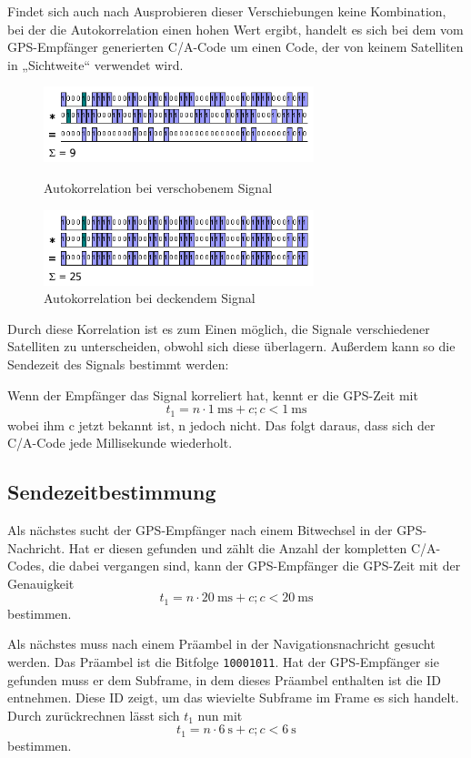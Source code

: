 \documentclass[12pt,a4paper]{scrartcl}
\begin{document}
Findet sich auch nach Ausprobieren dieser Verschiebungen keine Kombination, bei der die Autokorrelation einen hohen Wert ergibt, handelt es sich bei dem vom GPS-Empfänger generierten C/A-Code um einen Code, der von keinem Satelliten in „Sichtweite“ verwendet wird.

\begin{figure}[H]
\centering
\includegraphics[width=0.7\textwidth]{img/ac_9.png}
\caption{Autokorrelation bei verschobenem Signal\cite{kowoma_signalv}}
\includegraphics[width=0.7\textwidth]{img/ac_25.png}
\caption{Autokorrelation bei deckendem Signal\cite{kowoma_signalv}}
\label{fig:ac}
\end{figure}

Durch diese Korrelation ist es zum Einen möglich, die Signale verschiedener Satelliten zu unterscheiden, obwohl sich diese überlagern. Außerdem kann so die Sendezeit des Signals bestimmt werden:

Wenn der Empfänger das Signal korreliert hat, kennt er die GPS-Zeit mit $$t_1 = n\cdot\SI{1}{\milli\second} + c; c<\SI{1}{\milli\second}$$ wobei ihm c jetzt bekannt ist, n jedoch nicht. Das folgt daraus, dass sich der C/A-Code jede Millisekunde wiederholt.

\subsection{Sendezeitbestimmung}
Als nächstes sucht der GPS-Empfänger nach einem Bitwechsel in der GPS-Nachricht. Hat er diesen gefunden und zählt die Anzahl der kompletten C/A-Codes, die dabei vergangen sind, kann der GPS-Empfänger die GPS-Zeit mit der Genauigkeit  $$t_1 = n\cdot\SI{20}{\milli\second} + c; c<\SI{20}{\milli\second}$$ bestimmen.

Als nächstes muss nach einem Präambel in der Navigationsnachricht gesucht werden. Das Präambel ist die Bitfolge \texttt{10001011}. Hat der GPS-Empfänger sie gefunden muss er dem Subframe, in dem dieses Präambel enthalten ist die ID entnehmen. Diese ID zeigt, um das wievielte Subframe im Frame es sich handelt. Durch zurückrechnen lässt sich $t_1$ nun mit $$t_1 = n\cdot\SI{6}{\second} + c; c<\SI{6}{\second}$$ bestimmen.
\end{document}
